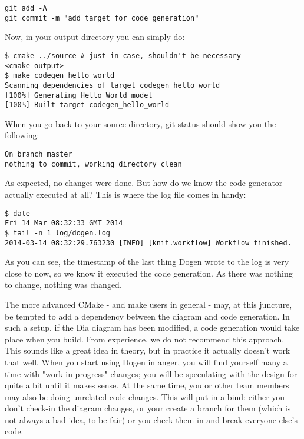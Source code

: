 \documentclass[11pt]{article}
\begin{document}
\begin{verbatim}
git add -A
git commit -m "add target for code generation"
\end{verbatim}

Now, in your output directory you can simply do:

\begin{verbatim}
$ cmake ../source # just in case, shouldn't be necessary
<cmake output>
$ make codegen_hello_world
Scanning dependencies of target codegen_hello_world
[100%] Generating Hello World model
[100%] Built target codegen_hello_world
\end{verbatim}

When you go back to your source directory, git status should show you
the following:

\begin{verbatim}
On branch master
nothing to commit, working directory clean
\end{verbatim}

As expected, no changes were done. But how do we know the code
generator actually executed at all? This is where the log file comes
in handy:

\begin{verbatim}
$ date
Fri 14 Mar 08:32:33 GMT 2014
$ tail -n 1 log/dogen.log
2014-03-14 08:32:29.763230 [INFO] [knit.workflow] Workflow finished.
\end{verbatim}

As you can see, the timestamp of the last thing Dogen wrote to the log
is very close to now, so we know it executed the code generation.  As
there was nothing to change, nothing was changed.

The more advanced CMake - and make users in general - may, at this
juncture, be tempted to add a dependency between the diagram and code
generation. In such a setup, if the Dia diagram has been modified, a
code generation would take place when you build. From experience, we
do not recommend this approach. This sounds like a great idea in
theory, but in practice it actually doesn't work that well. When you
start using Dogen in anger, you will find yourself many a time with
"work-in-progress" changes; you will be speculating with the design
for quite a bit until it makes sense. At the same time, you or other
team members may also be doing unrelated code changes. This will put
in a bind: either you don't check-in the diagram changes, or your
create a branch for them (which is not always a bad idea, to be fair)
or you check them in and break everyone else's code.
\end{document}
